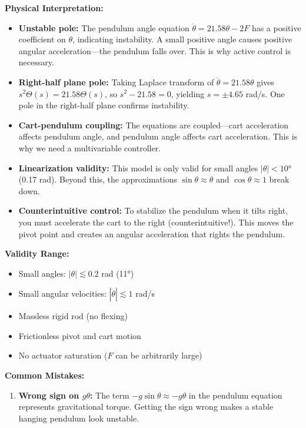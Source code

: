 \begin{example}
\textbf{Physical Interpretation:}

\begin{itemize}
    \item \textbf{Unstable pole:} The pendulum angle equation $\ddot{\theta} = 21.58\theta - 2F$ has a positive coefficient on $\theta$, indicating instability. A small positive angle causes positive angular acceleration—the pendulum falls over. This is why active control is necessary.

    \item \textbf{Right-half plane pole:} Taking Laplace transform of $\ddot{\theta} = 21.58\theta$ gives $s^2\Theta(s) = 21.58\Theta(s)$, so $s^2 - 21.58 = 0$, yielding $s = \pm 4.65$ rad/s. One pole in the right-half plane confirms instability.

    \item \textbf{Cart-pendulum coupling:} The equations are coupled—cart acceleration affects pendulum angle, and pendulum angle affects cart acceleration. This is why we need a multivariable controller.

    \item \textbf{Linearization validity:} This model is only valid for small angles $|\theta| < 10°$ (0.17 rad). Beyond this, the approximations $\sin\theta \approx \theta$ and $\cos\theta \approx 1$ break down.

    \item \textbf{Counterintuitive control:} To stabilize the pendulum when it tilts right, you must accelerate the cart to the right (counterintuitive!). This moves the pivot point and creates an angular acceleration that rights the pendulum.
\end{itemize}

\textbf{Validity Range:}

\begin{itemize}
    \item Small angles: $|\theta| \lesssim 0.2$ rad (11°)
    \item Small angular velocities: $|\dot{\theta}| \lesssim 1$ rad/s
    \item Massless rigid rod (no flexing)
    \item Frictionless pivot and cart motion
    \item No actuator saturation ($F$ can be arbitrarily large)
\end{itemize}

\textbf{Common Mistakes:}

\begin{enumerate}
    \item \textbf{Wrong sign on $g\theta$:} The term $-g\sin\theta \approx -g\theta$ in the pendulum equation represents gravitational torque. Getting the sign wrong makes a stable hanging pendulum look unstable.


\end{enumerate}
\end{example}
